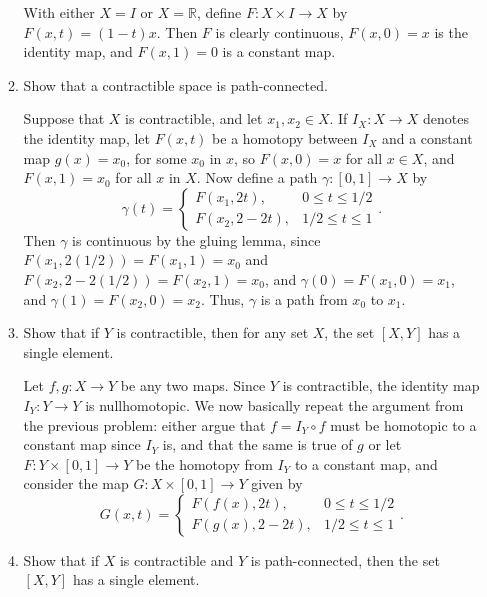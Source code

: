 \documentclass[letterpaper,12pt]{article}
\newcommand{\R}{\mathbb{R}}
\newcommand{\cla}[1]{\left[ #1\right]}
\begin{document}
\begin{enumerate}
\begin{enumerate}
\bigskip

With either $X=I$ or $X=\R$, define $F:X\times I\to X$ by $F(x,t) = (1-t)x$. Then $F$ is clearly continuous, $F(x,0)=x$ is the identity map, and $F(x,1)=0$ is a constant map.

\bigskip

\item Show that a contractible space is path-connected.

\bigskip

Suppose that $X$ is contractible, and let $x_1,x_2\in X$. If $I_X:X\to X$ denotes the identity map, let $F(x,t)$ be a homotopy between $I_X$ and a constant map $g(x)=x_0$, for some $x_0$ in $x$, so $F(x,0)=x$ for all $x\in X$, and $F(x,1)=x_0$ for all $x$ in $X$. Now define a path $\gamma:[0,1]\to X$ by
\[
 \gamma(t) = \begin{cases}
              F(x_1,2t), & 0\leq t\leq 1/2\\
	      F(x_2,2-2t), & 1/2\leq t\leq 1
             \end{cases}.
\]
Then $\gamma$ is continuous by the gluing lemma, since $F(x_1,2(1/2))=F(x_1,1)=x_0$ and $F(x_2,2-2(1/2))=F(x_2,1)=x_0$, and $\gamma(0)=F(x_1,0) = x_1$, and $\gamma(1) = F(x_2,0)=x_2$. Thus, $\gamma$ is a path from $x_0$ to $x_1$.

\bigskip

\item Show that if $Y$ is contractible, then for any set $X$, the set $\cla{X,Y}$ has a single element.

\bigskip

Let $f,g:X\to Y$ be any two maps. Since $Y$ is contractible, the identity map $I_Y:Y\to Y$ is nullhomotopic. We now basically repeat the argument from the previous problem: either argue that $f = I_Y\circ f$ must be homotopic to a constant map since $I_Y$ is, and that the same is true of $g$ or let $F:Y\times [0,1]\to Y$ be the homotopy from $I_Y$ to a constant map, and consider the map $G:X\times [0,1]\to Y$ given by
\[
 G(x,t) = \begin{cases}
           F(f(x),2t), & 0\leq t\leq 1/2\\
	   F(g(x), 2-2t), & 1/2\leq t\leq 1
          \end{cases}.
\]


\bigskip

\item Show that if $X$ is contractible and $Y$ is path-connected, then the set $\cla{X,Y}$ has a single element.

\bigskip


\end{enumerate}
\end{enumerate}
\end{document}
